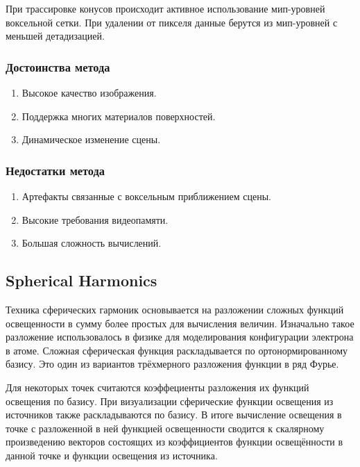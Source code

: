 \documentclass[12pt,fleqn]{article}
\begin{document}
При трассировке конусов происходит активное использование мип-уровней воксельной сетки. При удалении от пикселя данные берутся из мип-уровней с меньшей детадизацией.

\subsubsection{Достоинства метода}

\begin{enumerate}

\item Высокое качество изображения.

\item Поддержка многих материалов поверхностей.

\item Динамическое изменение сцены.

\end{enumerate}

\subsubsection{Недостатки метода}

\begin{enumerate}

\item Артефакты связанные с воксельным приближением сцены.

\item Высокие требования видеопамяти.

\item Большая сложность вычислений.

\end{enumerate}

\subsection{Spherical Harmonics}

Техника сферических гармоник основывается на разложении сложных функций освещенности в сумму более простых для вычисления величин. Изначально такое разложение использовалось в физике для моделирования конфигурации электрона в атоме. Сложная сферическая функция раскладывается по ортонормированному базису. Это один из вариантов трёхмерного разложения функции в ряд Фурье.

Для некоторых точек считаются коэффециенты разложения их функций освещения по базису. При визуализации сферические функции освещения из источников также раскладываются по базису. В итоге вычисление освещения в точке с разложенной в ней функцией освещенности сводится к скалярному произведению векторов состоящих из коэффициентов функции освещённости в данной точке и функции освещения из источника.
\end{document}
